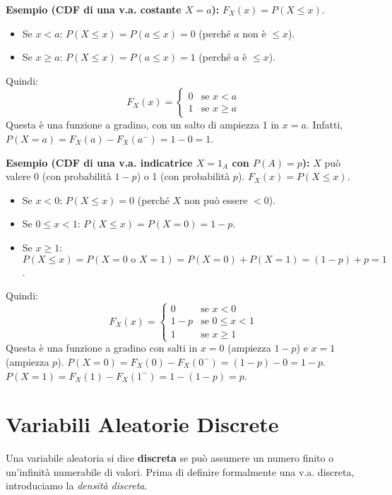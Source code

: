 \begin{example}
\textbf{Esempio (CDF di una v.a. costante $X=a$):}
$F_X(x) = P(X \le x)$.
\begin{itemize}
    \item Se $x < a$: $P(X \le x) = P(a \le x) = 0$ (perché $a$ non è $\le x$).
    \item Se $x \ge a$: $P(X \le x) = P(a \le x) = 1$ (perché $a$ è $\le x$).
\end{itemize}
Quindi:
\[ F_X(x) = \begin{cases} 0 & \text{se } x < a \\ 1 & \text{se } x \ge a \end{cases} \]
Questa è una funzione a gradino, con un salto di ampiezza 1 in $x=a$. Infatti, $P(X=a) = F_X(a) - F_X(a^-) = 1 - 0 = 1$.
\end{example}

\begin{example}
\textbf{Esempio (CDF di una v.a. indicatrice $X=1_A$ con $P(A)=p$):}
$X$ può valere 0 (con probabilità $1-p$) o 1 (con probabilità $p$).
$F_X(x) = P(X \le x)$.
\begin{itemize}
    \item Se $x < 0$: $P(X \le x) = 0$ (perché $X$ non può essere $<0$).
    \item Se $0 \le x < 1$: $P(X \le x) = P(X=0) = 1-p$.
    \item Se $x \ge 1$: $P(X \le x) = P(X=0 \text{ o } X=1) = P(X=0) + P(X=1) = (1-p)+p = 1$.
\end{itemize}
Quindi:
\[ F_X(x) = \begin{cases} 0 & \text{se } x < 0 \\ 1-p & \text{se } 0 \le x < 1 \\ 1 & \text{se } x \ge 1 \end{cases} \]
Questa è una funzione a gradino con salti in $x=0$ (ampiezza $1-p$) e $x=1$ (ampiezza $p$).
$P(X=0) = F_X(0) - F_X(0^-) = (1-p) - 0 = 1-p$.
$P(X=1) = F_X(1) - F_X(1^-) = 1 - (1-p) = p$.
\end{example}

\section{Variabili Aleatorie Discrete}

Una variabile aleatoria si dice \textbf{discreta} se può assumere un numero finito o un'infinità numerabile di valori. Prima di definire formalmente una v.a. discreta, introduciamo la \textit{densità discreta}.

